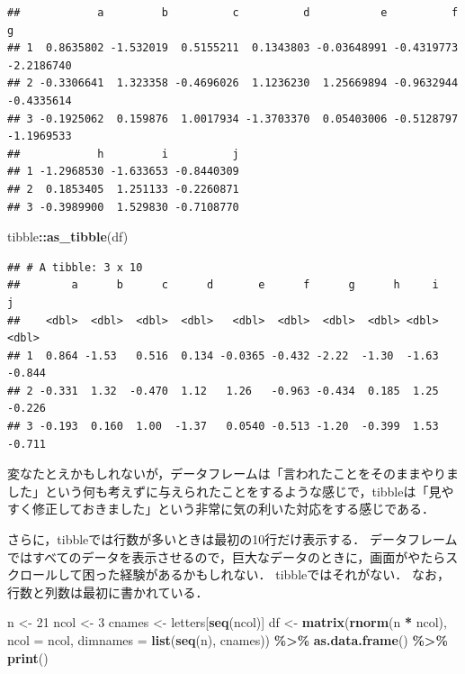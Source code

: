 \documentclass[
]{article}
\newenvironment{Shaded}{\begin{snugshade}}{\end{snugshade}}
\newcommand{\AttributeTok}[1]{\textcolor[rgb]{0.13,0.29,0.53}{#1}}
\newcommand{\DecValTok}[1]{\textcolor[rgb]{0.00,0.00,0.81}{#1}}
\newcommand{\FunctionTok}[1]{\textcolor[rgb]{0.13,0.29,0.53}{\textbf{#1}}}
\newcommand{\NormalTok}[1]{#1}
\newcommand{\OtherTok}[1]{\textcolor[rgb]{0.56,0.35,0.01}{#1}}
\newcommand{\SpecialCharTok}[1]{\textcolor[rgb]{0.81,0.36,0.00}{\textbf{#1}}}
\begin{document}
\begin{verbatim}
##            a         b          c          d           e          f          g
## 1  0.8635802 -1.532019  0.5155211  0.1343803 -0.03648991 -0.4319773 -2.2186740
## 2 -0.3306641  1.323358 -0.4696026  1.1236230  1.25669894 -0.9632944 -0.4335614
## 3 -0.1925062  0.159876  1.0017934 -1.3703370  0.05403006 -0.5128797 -1.1969533
##            h         i          j
## 1 -1.2968530 -1.633653 -0.8440309
## 2  0.1853405  1.251133 -0.2260871
## 3 -0.3989900  1.529830 -0.7108770
\end{verbatim}

\begin{Shaded}
\begin{Highlighting}[]
\NormalTok{tibble}\SpecialCharTok{::}\FunctionTok{as\_tibble}\NormalTok{(df)}
\end{Highlighting}
\end{Shaded}

\begin{verbatim}
## # A tibble: 3 x 10
##        a      b      c      d       e      f      g      h     i      j
##    <dbl>  <dbl>  <dbl>  <dbl>   <dbl>  <dbl>  <dbl>  <dbl> <dbl>  <dbl>
## 1  0.864 -1.53   0.516  0.134 -0.0365 -0.432 -2.22  -1.30  -1.63 -0.844
## 2 -0.331  1.32  -0.470  1.12   1.26   -0.963 -0.434  0.185  1.25 -0.226
## 3 -0.193  0.160  1.00  -1.37   0.0540 -0.513 -1.20  -0.399  1.53 -0.711
\end{verbatim}

変なたとえかもしれないが，データフレームは「言われたことをそのままやりました」という何も考えずに与えられたことをするような感じで，tibbleは「見やすく修正しておきました」という非常に気の利いた対応をする感じである．

さらに，tibbleでは行数が多いときは最初の10行だけ表示する．
データフレームではすべてのデータを表示させるので，巨大なデータのときに，画面がやたらスクロールして困った経験があるかもしれない．
tibbleではそれがない．
なお，行数と列数は最初に書かれている．

\begin{Shaded}
\begin{Highlighting}[]
\NormalTok{n }\OtherTok{\textless{}{-}} \DecValTok{21}
\NormalTok{ncol }\OtherTok{\textless{}{-}} \DecValTok{3}
\NormalTok{cnames }\OtherTok{\textless{}{-}}\NormalTok{ letters[}\FunctionTok{seq}\NormalTok{(ncol)]}
\NormalTok{df }\OtherTok{\textless{}{-}} 
  \FunctionTok{matrix}\NormalTok{(}\FunctionTok{rnorm}\NormalTok{(n }\SpecialCharTok{*}\NormalTok{ ncol), }\AttributeTok{ncol =}\NormalTok{ ncol, }\AttributeTok{dimnames =} \FunctionTok{list}\NormalTok{(}\FunctionTok{seq}\NormalTok{(n), cnames)) }\SpecialCharTok{\%\textgreater{}\%}
  \FunctionTok{as.data.frame}\NormalTok{() }\SpecialCharTok{\%\textgreater{}\%}
  \FunctionTok{print}\NormalTok{()}
\end{Highlighting}
\end{Shaded}
\end{document}
